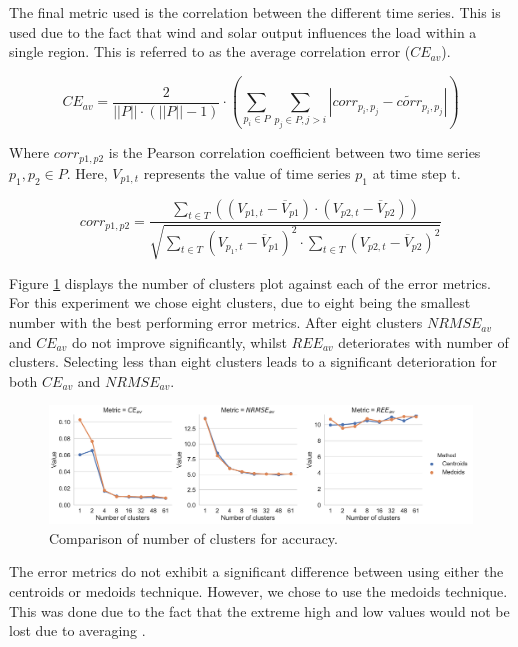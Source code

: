 \documentclass[final,3p,times,twocolumn,numbers]{elsarticle}
\begin{document}
The final metric used is the correlation between the different time series. This is used due to the fact that wind and solar output influences the load within a single region. This is referred to as the average correlation error ($CE_{av}$).

\begin{equation}
	CE_{av}=\frac{2}{\left|\left|P\right|\right|\cdot(\left|\left|P\right|\right|-1)}\cdot
	\left(
	\sum\limits_{p_i\in P}\sum\limits_{p_j\in P,j>i}
	\left|
	corr_{p_i,p_j}-\widetilde{corr}_{p_i,p_j}
	\right|
	\right)
\end{equation}

Where $corr_{p1,p2}$ is the Pearson correlation coefficient between two time series $p_1,p_2\in P$. Here, $V_{p1,t}$ represents the value of time series $p_1$ at time step t. 

\begin{equation}
	corr_{p1,p2}=\frac
	{\sum\limits_{t\in T}\left(\left(V_{p1,t}-\overline{V}_{p1}\right)\cdot\left(V_{p2,t}-\overline{V}_{p2}\right)\right)}
	{\sqrt{
	\sum\limits_{t\in T} \left(V_{p_1,t}-\overline{V}_{p1}\right)^2\cdot\sum\limits_{t\in T}\left(V_{p2,t}-\overline{V}_{p2}\right)^2
	}}
\end{equation}

Figure \ref{fig:clusters_compared} displays the number of clusters plot against each of the error metrics. For this experiment we chose eight clusters, due to eight being the smallest number with the best performing error metrics. After eight clusters $NRMSE_{av}$ and $CE_{av}$ do not improve significantly, whilst $REE_{av}$ deteriorates with number of clusters. Selecting less than eight clusters leads to a significant deterioration for both $CE_{av}$ and $NRMSE_{av}$.

\begin{figure}
\centering
\includegraphics[width=\textwidth]{figures/methods_and_materials/clusters_compared.pdf}
\caption{Comparison of number of clusters for accuracy.}
\label{fig:clusters_compared}
\end{figure}

The error metrics do not exhibit a significant difference between using either the centroids or medoids technique. However, we chose to use the medoids technique. This was done due to the fact that the extreme high and low values would not be lost due to averaging \cite{Hilbers2019}.
\end{document}
